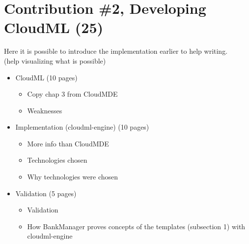 \section{Contribution \#2, Developing CloudML (25)}

Here it is possible to introduce the implementation earlier to help writing. \\
(help visualizing what is possible)

\begin{itemize}
  \item CloudML (10 pages)
    \begin{itemize}
      \item Copy chap 3 from CloudMDE
      \item Weaknesses
    \end{itemize}
  \item Implementation (cloudml-engine) (10 pages)
    \begin{itemize}
      \item More info than CloudMDE
      \item Technologies chosen
      \item Why technologies were chosen
    \end{itemize}
  \item Validation (5 pages)
    \begin{itemize}
      \item Validation
      \item How BankManager proves concepts of the templates (subsection 1) with cloudml-engine
    \end{itemize}
\end{itemize}

